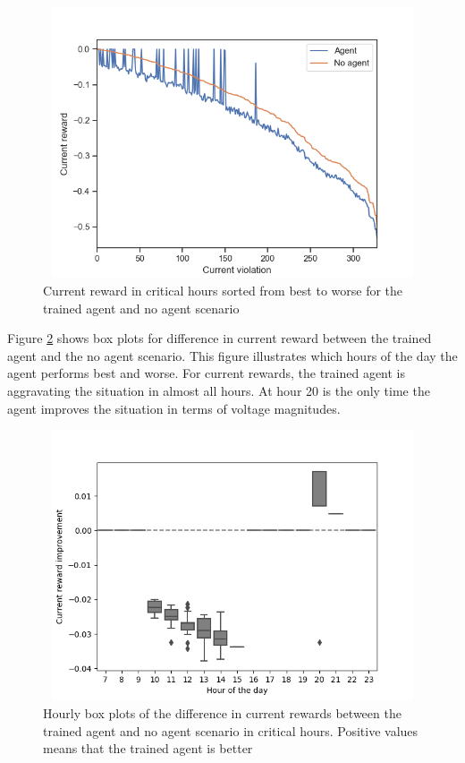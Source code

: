 \documentclass[class=book, crop=false]{standalone}
\begin{document}
\begin{figure}[H]
    \center
\includegraphics[height=8cm, width=12cm]{figures/config1_sorted_current.png}
    \caption[size = 9]{Current reward in critical hours sorted from best to worse for the trained agent and no agent scenario}
    \label{fig:results:config1_sorted_current}
\end{figure}



Figure \ref{fig:results:config1_improvement_current} shows box plots for difference in current reward between the trained agent and the no agent scenario. This figure illustrates which hours of the day the agent performs best and worse. For current rewards, the trained agent is aggravating the situation in almost all hours. At hour 20 is the only time the agent improves the situation in terms of voltage magnitudes.

\begin{figure}[h]
    \center
\includegraphics[height=8cm, width=12cm]{figures/config1_improvement_current.png}
    \caption[size = 9]{Hourly box plots of the difference in current rewards between the trained agent and no agent scenario in critical hours. Positive values means that the trained agent is better}
    \label{fig:results:config1_improvement_current}
\end{figure}
\end{document}
